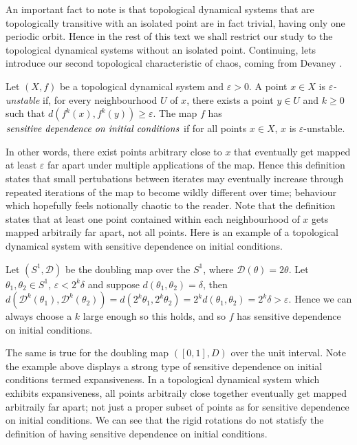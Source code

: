 An important fact to note is that topological dynamical systems that are topologically transitive with an isolated point are in fact trivial, having only one periodic orbit. Hence in the rest of this text we shall restrict our study to the topological dynamical systems without an isolated point. Continuing, lets introduce our second topological characteristic of chaos, coming from Devaney \cite{devaney}.

\begin{defn} \label{defn:sensitive-dependence}
    Let $(X, f)$ be a topological dynamical system and $\varepsilon > 0$. A point $x \in X$ is \emph{$\varepsilon$-unstable} if, for every neighbourhood $U$ of $x$, there exists a point $y \in U$ and $k \geq 0$ such that $d\left(f^k(x), f^k(y)\right) \geq \varepsilon$. The map $f$ has $\emph{sensitive dependence on initial conditions}$ if for all points $x \in X$, $x$ is $\varepsilon$-unstable.
\end{defn}

In other words, there exist points arbitrary close to $x$ that eventually get mapped at least $\varepsilon$ far apart under multiple applications of the map. Hence this definition states that small pertubations between iterates may eventually increase through repeated iterations of the map to become wildly different over time; behaviour which hopefully feels notionally chaotic to the reader. Note that the definition states that at least one point contained within each neighbourhood of $x$ gets mapped arbitraily far apart, not all points. Here is an example of a topological dynamical system with sensitive dependence on initial conditions.

\begin{exmp} \label{exmp:doubling-map-s1-sensitive}
    Let $(S^1, \mathcal{D})$ be the doubling map over the $S^1$, where $\mathcal{D}(\theta) = 2\theta$. Let $\theta_1, \theta_2 \in S^1$, $\varepsilon < 2^k \delta$ and suppose $d(\theta_1, \theta_2) = \delta$, then $d\left(\mathcal{D}^k(\theta_1), \mathcal{D}^k(\theta_2)\right) =  d\left(2^k\theta_1, 2^k\theta_2\right) = 2^k d(\theta_1, \theta_2) = 2^k \delta > \varepsilon$. Hence we can always choose a $k$ large enough so this holds, and so $f$ has sensitive dependence on initial conditions.
\end{exmp}

The same is true for the doubling map $([0, 1], D)$ over the unit interval. Note the example above displays a strong type of sensitive dependence on initial conditions termed expansiveness. In a topological dynamical system which exhibits expansiveness, all points arbitraily close together eventually get mapped arbitraily far apart; not just a proper subset of points as for sensitive dependence on initial conditions. We can see that the rigid rotations do not statisfy the definition of having sensitive dependence on initial conditions.


